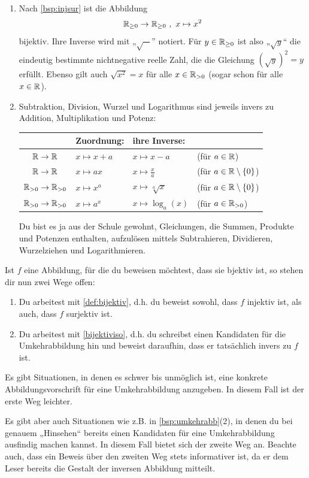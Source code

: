 \begin{bsp} \quad
    \begin{enumerate}
        \item Nach \cref{bsp:injsur} ist die Abbildung
            \[ \mathbb R_{\ge 0} \to \mathbb R_{\ge 0} \ ,\ x \mapsto x^2 \]
        bijektiv. Ihre Inverse wird mit „$\sqrt{-}$” notiert. Für $y\in \mathbb R_{\ge 0}$ ist also „$\sqrt{y}$“ die eindeutig bestimmte nichtnegative reelle Zahl, die die Gleichung $(\sqrt{y})^2=y$ erfüllt. Ebenso gilt auch $\sqrt{x^2}=x$ für alle $x\in \mathbb R_{>0}$ (sogar schon für alle $x\in \mathbb R$).
        \item Subtraktion, Division, Wurzel und Logarithmus sind jeweils invers zu Addition, Multiplikation und Potenz:\begin{longtable}{clll}
            \phantom{Mengen} & Zuordnung: & ihre Inverse: & \phantom{Platzhalter}\\
            \midrule
            $\mathbb R\to \mathbb R$ & $x\mapsto x+a$ & $x\mapsto x-a$ & (für $a\in \mathbb R$)\\
            $\mathbb R\to \mathbb R$ & $x\mapsto ax$ & $x\mapsto \frac{x}{a}$ & (für $a\in \mathbb R\setminus \{0\}$) \\
            $\mathbb R_{> 0} \to \mathbb R_{> 0}$ & $x\mapsto x^a$ & $x\mapsto \sqrt[a]{x}$ & (für $a\in \mathbb R\setminus \{0\}$) \\
            $\mathbb R_{>0} \to \mathbb R_{>0}$ & $x \mapsto a^x$ & $x \mapsto \log_a(x)$ & (für $a\in \mathbb R_{>0}$)
        \end{longtable}
        Du bist es ja aus der Schule gewohnt, Gleichungen, die Summen, Produkte und Potenzen enthalten, aufzulösen mittels Subtrahieren, Dividieren, Wurzelziehen und Logarithmieren.
    \end{enumerate}
\end{bsp}


\begin{bem}
    Ist $f$ eine Abbildung, für die du beweisen möchtest, dass sie bjektiv ist, so stehen dir nun zwei Wege offen:
    \begin{enumerate}
        \item Du arbeitest mit \cref{def:bijektiv}, d.h. du beweist sowohl, dass $f$ injektiv ist, als auch, dass $f$ surjektiv ist.
        \item Du arbeitest mit \cref{bijektiviso}, d.h. du schreibst einen Kandidaten für die Umkehrabbildung hin und beweist daraufhin, dass er tatsächlich invers zu $f$ ist.
    \end{enumerate}
    Es gibt Situationen, in denen es schwer bis unmöglich ist, eine konkrete Abbildungsvorschrift für eine Umkehrabbildung anzugeben. In diesem Fall ist der erste Weg leichter.
    
    Es gibt aber auch Situationen wie z.B. in \cref{bsp:umkehrabb}(2), in denen du bei genauem „Hinsehen“ bereits einen Kandidaten für eine Umkehrabbildung ausfindig machen kannst. In diesem Fall bietet sich der zweite Weg an. Beachte auch, dass ein Beweis über den zweiten Weg stets informativer ist, da er dem Leser bereits die Gestalt der inversen Abbildung mitteilt.
\end{bem}


